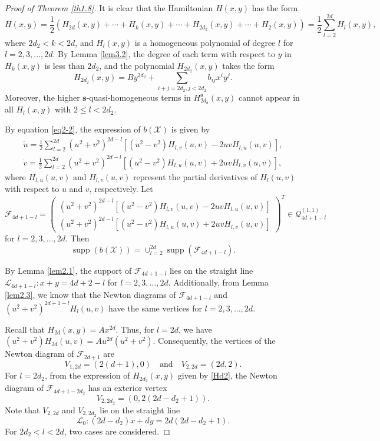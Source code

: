 \documentclass[reqno]{amsart}
\begin{document}
\begin{proof}[Proof of Theorem \ref{th1.8}]
It is clear that the Hamiltonian $H(x,y)$ has the  form
\[ %
 H(x,y)= \frac{1}{2}\left(H_{2d}(x,y)+\cdots+H_{k}(x,y)+\cdots
 +H_{2d_2}(x,y)+\cdots+H_{2}(x,y)\right)
= \frac{1}{2}\sum_{l=2}^{2d}H_l(x,y),
\]
where $2d_2<k<2d$, and $H_l(x,y)$ is a homogeneous polynomial of degree $l$ for
$l=2,3,\dots,2d$. By Lemma \ref{lem3.2}, the degree of each term with respect to $y$ 
in $H_k(x,y)$ is less than $2d_2$, and the polynomial $H_{2 d_2}(x,y)$ takes the form
\begin{equation}\label{Hd2}
H_{2d_2}(x,y)=By^{2d_2}+\sum_{i+j=2d_2, j<2d_2}b_{ij}x^{i}y^{j}.
\end{equation}
Moreover, the higher $\mathbf{s}$-quasi-homogeneous terms in 
$H^{\mathbf{s}}_{2d_{\mathbf{s}}}(x,y)$ cannot appear in all $H_l(x,y)$ with 
$2\leq l<2d_2$.

By equation \eqref{eq2-2}, the expression of $b(\mathcal{X})$ is given by
\begin{equation}\label{eq3-5}
\begin{gathered}
\dot u  = \frac{1}{2}\sum_{l=2}^{2d}(u^{2}+v^{2})^{2d-l}[(u^{2}-v^{2})H_{l,v}(u,v)-2uvH_{l,u}(u,v)], \\
\dot v  = \frac{1}{2}\sum_{l=2}^{2d}(u^{2}+v^{2})^{2d-l}[(u^{2}-v^{2})H_{l,u}(u,v)+2uvH_{l,v}(u,v)],
\end{gathered}
\end{equation}
where $H_{l,u}(u,v)$ and $H_{l,v}(u,v)$ represent the partial derivatives of 
$H_l(u,v)$ with respect to $u$ and $v$, respectively. Let
\begin{equation}\label{eq3-6}
\mathcal{F}_{4d+1-l}
=\begin{pmatrix}
 (u^{2}+v^{2})^{2d-l}[(u^{2}-v^{2})H_{l,v}(u,v)-2uvH_{l,u}(u,v)] \\
 (u^{2}+v^{2})^{2d-l}[(u^{2}-v^{2})H_{l,u}(u,v)+2uvH_{l,v}(u,v)]
\end{pmatrix}^T\in \mathcal{Q}_{4d+1-l}^{(1,1)}
\end{equation}
for $l=2,3,\dots,2d$. Then
$$
\operatorname{supp}(b(\mathcal{X}))
=\cup_{l=2}^{2d}\operatorname{supp}(\mathcal{F}_{4d+1-l}).
$$

By Lemma \ref{lem2.1}, the support of $\mathcal{F}_{4d+1-l}$ lies on the straight 
line $\mathcal{L}_{4d+1-l}:x+y=4d+2-l$ for $l=2,3,\dots,2d$. Additionally, from 
Lemma \ref{lem2.3}, we know that  the Newton diagrams of $\mathcal{F}_{4d+1-l}$ 
and $(u^2+v^2)^{2d+1-l}H_{l}(u,v)$ have the same vertices for $l=2,3,\dots,2d$.

Recall that $H_{2d}(x,y)=Ax^{2d}$. Thus, for $l=2d$, we have 
$(u^2+v^2)H_{2d}(u,v)=Au^{2d}(u^2+v^2)$. Consequently, the vertices of the Newton 
diagram of $\mathcal{F}_{2d+1}$ are
\[
V_{1,2d}=(2(d+1),0)\quad \text{and} \quad V_{2,2d}=(2d,2).
\]
For $l=2d_2$, from the expression of $H_{2d_2}(x,y)$ given by \eqref{Hd2}, 
the Newton diagram of $\mathcal{F}_{4d+1-2d_2}$ has an exterior vertex
\[
V_{2,2d_2}=(0,2(2d-d_2+1)).
\]
Note that $V_{2,2d}$ and $V_{2,2d_2}$ lie on the straight line
\begin{equation}\label{l1}
\mathcal{L}_0:(2d-d_2)x+dy=2d(2d-d_2+1).
\end{equation}
For $2d_2<l<2d$, two cases are considered.


\end{proof}
\end{document}
